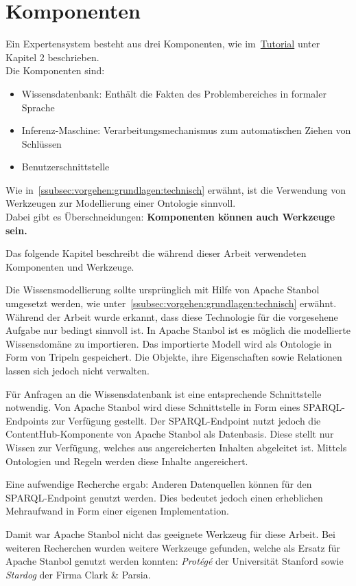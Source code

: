 \chapter{Komponenten}
\label{chap:komponenten}
Ein Expertensystem besteht aus drei Komponenten, wie im~\hyperref[sec:anhang:tutorial_dokument]{Tutorial} unter Kapitel 2 beschrieben.\\
Die Komponenten sind:
\begin{itemize}
    \item Wissensdatenbank: Enthält die Fakten des Problembereiches in formaler Sprache
    \item Inferenz-Maschine: Verarbeitungsmechanismus zum automatischen Ziehen von Schlüssen
    \item Benutzerschnittstelle
\end{itemize}
Wie in~\autoref{ssubsec:vorgehen:grundlagen:technisch} erwähnt, ist die Verwendung von Werkzeugen zur Modellierung einer Ontologie sinnvoll.\\
Dabei gibt es Überschneidungen: \textbf{Komponenten können auch Werkzeuge sein.}

Das folgende Kapitel beschreibt die während dieser Arbeit verwendeten Komponenten und Werkzeuge.

Die Wissensmodellierung sollte ursprünglich mit Hilfe von Apache Stanbol umgesetzt werden, wie unter~\autoref{ssubsec:vorgehen:grundlagen:technisch} erwähnt. Während der Arbeit wurde erkannt, dass diese Technologie für die vorgesehene Aufgabe nur bedingt sinnvoll ist. In Apache Stanbol ist es möglich die modellierte Wissensdomäne zu importieren. Das importierte Modell wird als Ontologie in Form von Tripeln gespeichert. Die Objekte, ihre Eigenschaften sowie Relationen lassen sich jedoch nicht verwalten.

Für Anfragen an die Wissensdatenbank ist eine entsprechende Schnittstelle notwendig. Von Apache Stanbol wird diese Schnittstelle in Form eines SPARQL-Endpoints zur Verfügung gestellt. Der SPARQL-Endpoint nutzt jedoch die ContentHub-Komponente von Apache Stanbol als Datenbasis. Diese stellt nur Wissen zur Verfügung, welches aus angereicherten Inhalten abgeleitet ist. Mittels Ontologien und Regeln werden diese Inhalte angereichert.

Eine aufwendige Recherche ergab: Anderen Datenquellen können für den SPARQL-Endpoint genutzt werden. Dies bedeutet jedoch einen erheblichen Mehraufwand in Form einer eigenen Implementation.

Damit war Apache Stanbol nicht das geeignete Werkzeug für diese Arbeit. Bei weiteren Recherchen wurden weitere Werkzeuge gefunden, welche als Ersatz für Apache Stanbol genutzt werden konnten: \textit{Protégé} der Universität Stanford sowie \textit{Stardog} der Firma Clark \& Parsia.

